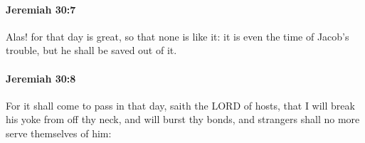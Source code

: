 		\paragraph{Jeremiah 30:7} %
			\label{JEREMIAH-30-7}

			Alas! for that day is great, so that none is like it: it is even the time of Jacob’s trouble, but he shall be saved out of it.


		\paragraph{Jeremiah 30:8} %
			\label{JEREMIAH-30-8}

			For it shall come to pass in that day, saith the LORD of hosts, that I will break his yoke from off thy neck, and will burst thy bonds, and strangers shall no more serve themselves of him:


